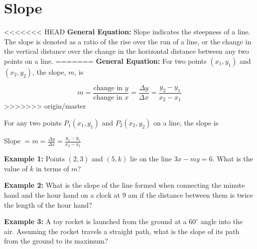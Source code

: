 \section{Slope}

<<<<<<< HEAD
\textbf{General Equation:} Slope indicates the steepness of a line. The slope is denoted as a ratio of the rise over the run of a line, or the change in the vertical distance over the change in the horizontal distance between any two points on a line.
=======
\textbf{General Equation:} For two points $(x_1,y_1)$ and $(x_2,y_2)$, the slope, $m$, is

\[m=\frac{\textrm{change in }y}{\textrm{change in }x}=\frac{\Delta y}{\Delta x}=\frac{y_2-y_1}{x_2-x_1}\]
>>>>>>> origin/master

\bigskip
For any two points $P_1(x_1,y_1)$ and $P_2(x_2,y_2)$ on a line, the slope is

\begin{center}
Slope $= m = \frac{\Delta y}{\Delta x}=\frac{y_2-y_1}{x_2-x_1}$
\end{center}

\vfill\textbf{Example 1:} Points $(2,3)$ and $(5,k)$ lie on the line $3x-my=6$. What is the value of $k$ in terms of $m$?

\vfill\textbf{Example 2:} What is the slope of the line formed when connecting the minute hand and the hour hand on a clock at 9 am if the distance between them is twice the length of the hour hand?

\vfill\textbf{Example 3:} A toy rocket is launched from the ground at a $60^\circ$ angle into the air. Assuming the rocket travels a straight path, what is the slope of its path from the ground to its maximum?

